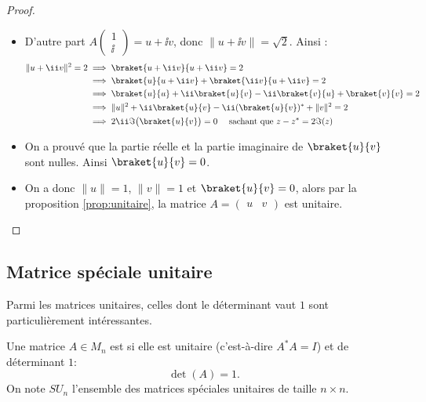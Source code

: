 \documentclass[11pt,class=report,crop=false]{standalone}
\begin{document}
\begin{proof}
\begin{itemize}
\begin{itemize}
  \item D'autre part $A \left(\begin{smallmatrix}1\\\ii\end{smallmatrix}\right) = u+\ii v$,
  donc $\|u+\ii v\| = \sqrt2$.
  Ainsi :
  \begin{align*}
  \|u+ \ii v\|^2 = 2 
   &\implies \braket{u+\ii v}{u+\ii v} = 2 \\
   &\implies \braket{u}{u+\ii v} + \braket{\ii v}{u+\ii v} = 2 \\
   &\implies \braket{u}{u} + \ii\braket{u}{v} -\ii\braket{v}{u} +\braket{v}{v} = 2 \\
   &\implies \|u\|^2 + \ii\braket{u}{v} - \ii(\braket{u}{v})^* + \|v\|^2 = 2 \\
   &\implies 2\ii\Im\big( \braket{u}{v} \big) = 0 \quad \text{ sachant que } z-z^* = 2\Im(z)\\
  \end{align*}
  
  \item On a prouvé que la partie réelle et la partie imaginaire de $\braket{u}{v}$ sont nulles. Ainsi $\braket{u}{v} = 0$.
  
  \item On a donc $\|u\|=1$, $\|v\|=1$ et $\braket{u}{v}=0$, alors par la proposition \ref{prop:unitaire}, la matrice $A = \begin{pmatrix}u & v\end{pmatrix}$ est unitaire.
\end{itemize}
\end{itemize}
\end{proof}



\subsection{Matrice spéciale unitaire}

Parmi les matrices unitaires, celles dont le déterminant vaut $1$ sont particulièrement intéressantes.

\begin{definition}
Une matrice $A \in M_n$ est  si elle est unitaire (c'est-à-dire $A^* A = I$) et de déterminant $1$: 
$$\det(A) = 1.$$ 
On note $SU_n$ l'ensemble des matrices spéciales unitaires de taille $n \times n$.
\end{definition}
\end{document}
